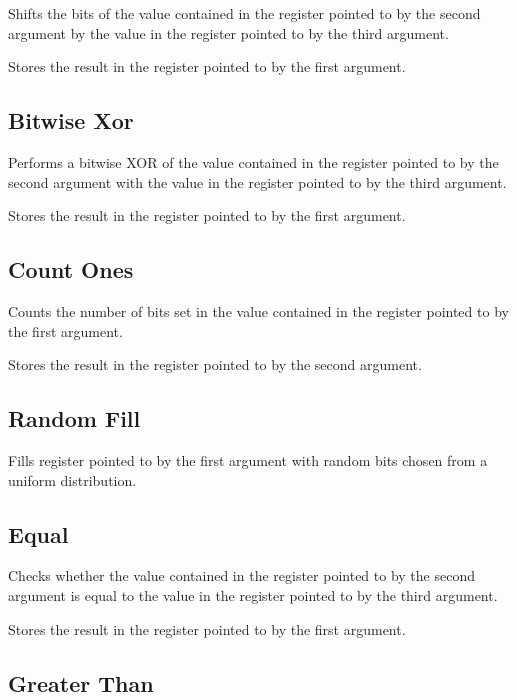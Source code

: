
Shifts the bits of the value contained in the register pointed to by the second argument by the value in the register pointed to by the third argument.

Stores the result in the register pointed to by the first argument.

\subsection{Bitwise Xor}


Performs a bitwise XOR of the value contained in the register pointed to by the second argument with the value in the register pointed to by the third argument.

Stores the result in the register pointed to by the first argument.

\subsection{Count Ones}


Counts the number of bits set in the value contained in the register pointed to by the first argument.

Stores the result in the register pointed to by the second argument.

\subsection{Random Fill}


Fills register pointed to by the first argument with random bits chosen from a uniform distribution.

\subsection{Equal}


Checks whether the value contained in the register pointed to by the second argument is equal to the value in the register pointed to by the third argument.

Stores the result in the register pointed to by the first argument.

\subsection{Greater Than}

